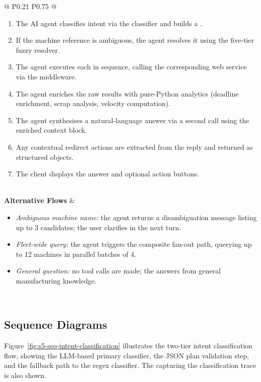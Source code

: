 \begin{longtable}{@{} P{0.21\linewidth} P{0.75\linewidth} @{}}
\begin{enumerate}[resume, nosep, leftmargin=*]
		\item The AI agent classifies intent via the  classifier
			and builds a .
		\item If the machine reference is ambiguous, the agent resolves it using the
			five-tier fuzzy resolver.
		\item The agent executes each  in sequence, calling the
			corresponding  web service via the  middleware.
		\item The agent enriches the raw results with pure-Python analytics
			(deadline enrichment, scrap analysis, velocity computation).
		\item The agent synthesises a natural-language answer via a second 
			call using the enriched context block.
		\item Any contextual redirect actions are extracted from the reply and returned
			as structured  objects.
		\item The  client displays the answer and optional action buttons.
	\end{enumerate} \\
	\midrule
	\textbf{Alternative Flows} &
	\begin{itemize}[nosep, leftmargin=*]
		\item \textit{Ambiguous machine name:} the agent returns a disambiguation
			message listing up to 3 candidates; the user clarifies in the next turn.
		\item \textit{Fleet-wide query:} the agent triggers the composite fan-out
			path, querying up to 12 machines in parallel batches of 4.
		\item \textit{General question:} no tool calls are made; the 
			answers from general manufacturing knowledge.
 	\end{itemize} \\
\end{longtable}


\subsection{Sequence Diagrams}

Figure~\ref{fig:s5-seq-intent-classification} illustrates the two-tier intent classification flow, showing the LLM-based primary classifier, the JSON plan validation step, and the fallback path to the regex classifier. The  capturing the classification trace is also shown.

